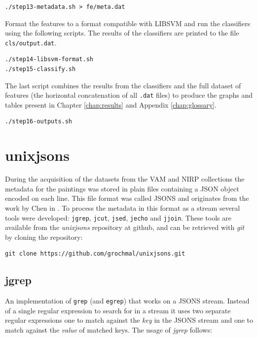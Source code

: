 \documentclass[11pt,a4paper,twoside,openright]{report}
\begin{document}
\begin{Verbatim}[frame=leftline]
./step13-metadata.sh > fe/meta.dat
\end{Verbatim}

Format the features to a format compatible with LIBSVM and run the classifiers
using the following scripts.  The results of the classifiers are printed to the
file \texttt{cls/output.dat}.

\begin{Verbatim}[frame=leftline]
./step14-libsvm-format.sh
./step15-classify.sh
\end{Verbatim}

The last script combines the results from the classifiers and the full dataset
of features (the horizontal concatenation of all \texttt{.dat} files) to
produce the graphs and tables present in Chapter \ref{chap:results} and
Appendix \ref{chap:glossary}.

\begin{Verbatim}[frame=leftline]
./step16-outputs.sh
\end{Verbatim}

\chapter{unixjsons}
\label{chap:unixjsons}

During the acquisition of the datasets from the VAM and NIRP collections the
metadata for the paintings was stored in plain files containing a JSON object
encoded on each line.  This file format was called JSONS and originates from
the work by Chen in \cite{chen09yahoo}.  To process the metadata in this format
as a stream several tools were developed: \texttt{jgrep}, \texttt{jcut},
\texttt{jsed}, \texttt{jecho} and \texttt{jjoin}.  These tools are available
from the \emph{unixjsons} repository at github, and can be retrieved with
\emph{git} by cloning the repository:

\begin{verbatim}
git clone https://github.com/grochmal/unixjsons.git
\end{verbatim}


\section{jgrep}

An implementation of \texttt{grep} (and \texttt{egrep}) that works on a JSONS
stream.  Instead of a single regular expression to search for in a stream it
uses two separate regular expressions one to match against the \emph{key} in
the JSONS stream and one to match against the \emph{value} of matched keys.
The usage of \emph{jgrep} follows:
\end{document}
